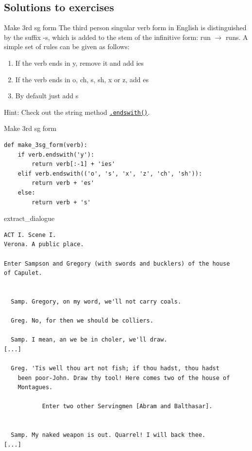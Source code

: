 \documentclass[aspectratio=169,usenames,dvipsnames]{beamer}
\begin{document}

\subsection{Solutions to exercises}
\begin{frame}{Make 3rd sg form}
The third person singular verb form in English is distinguished by the suffix
-s, which is added to the stem of the infinitive form: run $\rightarrow$ runs.
A simple set of rules can be given as follows:
\begin{enumerate}
    \item If the verb ends in y, remove it and add ies
    \item If the verb ends in o, ch, s, sh, x or z, add es
    \item By default just add s
\end{enumerate}

\vspace{1em}
Hint: Check out the string method \href{https://docs.python.org/3/library/stdtypes.html\#str.endswith}{\lstinline{.endswith()}}.
\end{frame}

\begin{frame}[fragile]{Make 3rd sg form}
\begin{lstlisting}
def make_3sg_form(verb):
    if verb.endswith('y'):
        return verb[:-1] + 'ies'
    elif verb.endswith(('o', 's', 'x', 'z', 'ch', 'sh')):
        return verb + 'es'
    else:
        return verb + 's'
\end{lstlisting}
\end{frame}


\begin{frame}[fragile]{extract\_dialogue}
\scriptsize
\begin{verbatim}
ACT I. Scene I.
Verona. A public place.

Enter Sampson and Gregory (with swords and bucklers) of the house
of Capulet.


  Samp. Gregory, on my word, we'll not carry coals.

  Greg. No, for then we should be colliers.

  Samp. I mean, an we be in choler, we'll draw.
[...]

  Greg. 'Tis well thou art not fish; if thou hadst, thou hadst
    been poor-John. Draw thy tool! Here comes two of the house of
    Montagues.

           Enter two other Servingmen [Abram and Balthasar].


  Samp. My naked weapon is out. Quarrel! I will back thee.
[...]
\end{verbatim}
\end{frame}
\end{document}

